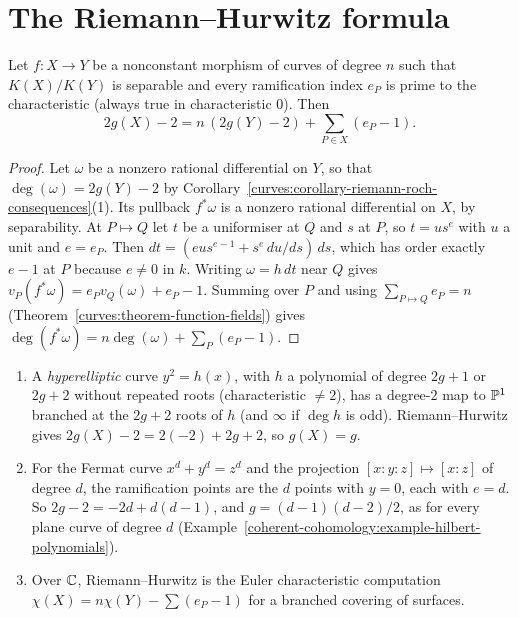 \section{The Riemann--Hurwitz formula}\label{curves:section-riemann-hurwitz}

\begin{theorem}\label{curves:theorem-riemann-hurwitz}
Let $f \colon X \to Y$ be a nonconstant morphism of curves of degree $n$ such that $K(X)/K(Y)$ is separable and every ramification index $e_P$ is prime to the
characteristic (always true in characteristic $0$). Then
\[
2g(X) - 2 = n\,(2g(Y) - 2) + \sum_{P \in X}(e_P - 1) .
\]
\end{theorem}

\begin{proof}
Let $\omega$ be a nonzero rational differential on $Y$, so that $\deg(\omega) = 2g(Y) - 2$ by Corollary~\ref{curves:corollary-riemann-roch-consequences}(1). Its pullback
$f^*\omega$ is a nonzero rational differential on $X$, by separability. At $P \mapsto Q$ let $t$ be a uniformiser at $Q$ and $s$ at $P$, so $t = us^{e}$ with $u$ a unit and
$e = e_P$. Then $dt = (eus^{e-1} + s^e\,du/ds)\,ds$, which has order exactly $e - 1$ at $P$ because $e \neq 0$ in $k$. Writing $\omega = h\,dt$ near $Q$ gives
$v_P(f^*\omega) = e_Pv_Q(\omega) + e_P - 1$. Summing over $P$ and using $\sum_{P \mapsto Q}e_P = n$ (Theorem~\ref{curves:theorem-function-fields}) gives
$\deg(f^*\omega) = n\deg(\omega) + \sum_P(e_P - 1)$.
\end{proof}

\begin{example}\label{curves:example-riemann-hurwitz}
\begin{enumerate}
\item A \emph{hyperelliptic} curve $y^2 = h(x)$, with $h$ a polynomial of degree $2g + 1$ or $2g + 2$ without repeated roots (characteristic $\neq 2$), has a degree-$2$ map to
$\mathbb{P}^1$ branched at the $2g + 2$ roots of $h$ (and $\infty$ if $\deg h$ is odd). Riemann--Hurwitz gives $2g(X) - 2 = 2(-2) + 2g + 2$, so $g(X) = g$.
\item For the Fermat curve $x^d + y^d = z^d$ and the projection $[x : y : z] \mapsto [x : z]$ of degree $d$, the ramification points are the $d$ points with $y = 0$, each with $e = d$.
So $2g - 2 = -2d + d(d - 1)$, and $g = (d-1)(d-2)/2$, as for every plane curve of degree $d$ (Example~\ref{coherent-cohomology:example-hilbert-polynomials}).
\item Over $\mathbb{C}$, Riemann--Hurwitz is the Euler characteristic computation $\chi(X) = n\chi(Y) - \sum(e_P - 1)$ for a branched covering of surfaces.
\end{enumerate}
\end{example}


